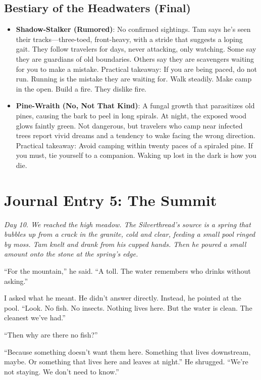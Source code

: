 \documentclass[11pt]{article}
\begin{document}
\subsection*{Bestiary of the Headwaters (Final)}
\begin{itemize}
    \item \textbf{Shadow-Stalker (Rumored)}: No confirmed sightings. Tam says he's seen their tracks---three-toed, front-heavy, with a stride that suggests a loping gait. They follow travelers for days, never attacking, only watching. Some say they are guardians of old boundaries. Others say they are scavengers waiting for you to make a mistake. Practical takeaway: If you are being paced, do not run. Running is the mistake they are waiting for. Walk steadily. Make camp in the open. Build a fire. They dislike fire.
    \item \textbf{Pine-Wraith (No, Not That Kind)}: A fungal growth that parasitizes old pines, causing the bark to peel in long spirals. At night, the exposed wood glows faintly green. Not dangerous, but travelers who camp near infected trees report vivid dreams and a tendency to wake facing the wrong direction. Practical takeaway: Avoid camping within twenty paces of a spiraled pine. If you must, tie yourself to a companion. Waking up lost in the dark is how you die.
\end{itemize}

\section*{Journal Entry 5: The Summit}
\textit{Day 10. We reached the high meadow. The Silverthread's source is a spring that bubbles up from a crack in the granite, cold and clear, feeding a small pool ringed by moss. Tam knelt and drank from his cupped hands. Then he poured a small amount onto the stone at the spring's edge.}

``For the mountain,'' he said. ``A toll. The water remembers who drinks without asking.''

I asked what he meant. He didn't answer directly. Instead, he pointed at the pool. ``Look. No fish. No insects. Nothing lives here. But the water is clean. The cleanest we've had.''

``Then why are there no fish?''

``Because something doesn't want them here. Something that lives downstream, maybe. Or something that lives here and leaves at night.'' He shrugged. ``We're not staying. We don't need to know.''
\end{document}
